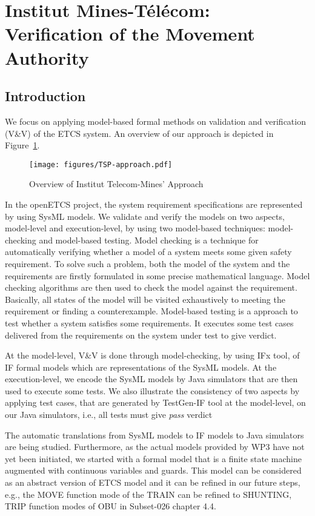 \section{Institut Mines-Télécom: Verification of the Movement Authority}
\label{sec:int}
\subsection{Introduction}

We focus on applying model-based formal methods on validation and verification
(V\&V) of the ETCS system.
An overview of our approach is depicted in Figure~\ref{fig:approach}.

\begin{figure}[!htbp]
\begin{center}
  \texttt{[image: figures/TSP-approach.pdf]}
  \caption{Overview of Institut Telecom-Mines' Approach}
  \label{fig:approach}
\end{center}
\end{figure}


In the openETCS project, the system requirement specifications are represented
by using SysML models. We validate and verify the models on two aspects,
model-level and execution-level, by using two model-based techniques:
model-checking and model-based testing.
%
Model checking is a technique for automatically verifying whether a model of a system meets some given safety requirement.
To solve such a problem, both the model of the system and the requirements are firstly formulated in some precise mathematical language.
Model checking algorithms are then used to check the model against the requirement.
Basically, all states of the model will be visited exhaustively to meeting the requirement or finding a counterexample. 
Model-based testing is a approach to test whether a system satisfies some requirements.
It executes some test cases delivered from the requirements on the system under test to give verdict.

At the model-level, V\&V is done through model-checking, by using IFx tool, of
IF formal models which are representations of the SysML models.
At the execution-level, we encode the SysML models by Java simulators that are
then used to execute some tests.
We also illustrate the consistency of two aspects by applying test cases, that
are generated by TestGen-IF tool at the model-level, on our Java simulators,
i.e., all tests must give {\em pass} verdict

The automatic translations from SysML models to IF models to Java simulators are
being studied. Furthermore, as the actual models provided by WP3 have not yet
been initiated, we started with a formal model that is a finite state machine
augmented with continuous variables and guards. This model can be considered as
an abstract version of ETCS model and it can be refined in our future steps,
e.g., the MOVE function mode of the TRAIN can be refined to SHUNTING,
TRIP function modes of OBU in Subset-026 chapter 4.4.

